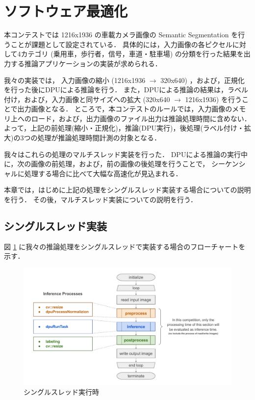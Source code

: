 \section{ソフトウェア最適化}
本コンテストでは 1216x1936 の車載カメラ画像の Semantic Segmentation を行うことが課題として設定されている．
具体的には，入力画像の各ピクセルに対して4カテゴリ (乗用車，歩行者，信号，車道・駐車場)
の分類を行った結果を出力する推論アプリケーションの実装が求められる．

我々の実装では，
入力画像の縮小 (1216x1936 $\rightarrow$ 320x640) ，および，正規化を行った後にDPUによる推論を行う．
また，DPUによる推論の結果は，ラベル付け，および，入力画像と同サイズへの拡大 (320x640 $\rightarrow$ 1216x1936) を行うことで出力画像となる．
ところで，本コンテストのルールでは，入力画像のメモリ上へのロード，および，出力画像のファイル出力は推論処理時間に含めない．
よって，上記の前処理(縮小・正規化)，推論(DPU実行)，後処理(ラベル付け・拡大)の3つの処理が推論処理時間計測の対象となる．

我々はこれらの処理のマルチスレッド実装を行った．
DPUによる推論の実行中に，次の画像の前処理，および，前の画像の後処理を行うことで，
シーケンシャルに処理する場合に比べて大幅な高速化が見込まれる．

本章では，はじめに上記の処理をシングルスレッド実装する場合についての説明を行う．
その後，マルチスレッド実装についての説明を行う．

\subsection{シングルスレッド実装}
図 \ref{fig:singlethread} に我々の推論処理をシングルスレッドで実装する場合のフローチャートを示す．

\begin{figure}[h]
  \begin{center}
    \includegraphics[width=\linewidth]{figures/sw_opt_flowchart_singlethread.pdf}
    \caption{シングルスレッド実行時}
    \label{fig:singlethread}
  \end{center}
\end{figure}

